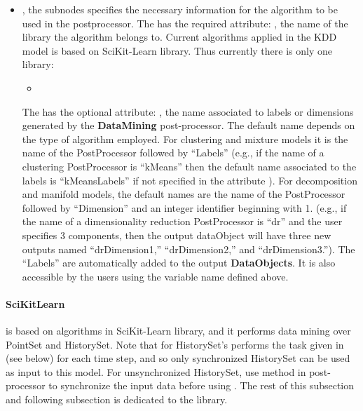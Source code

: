 \begin{itemize}
  \item {} , the subnodes specifies
  the necessary information for the algorithm to be used in the postprocessor.
  The  has the required attribute: , the name of the
  library the algorithm belongs to. Current algorithms applied in the KDD model
  is based on SciKit-Learn library. Thus currently there is only one library:
  \begin{itemize}
    \item {}
  \end{itemize}
  The  has the optional attribute: , the name
  associated to labels or dimensions generated by the \textbf{DataMining}
  post-processor.
  The default name depends on the type of algorithm employed.
  For clustering and mixture models it is the name of the PostProcessor
  followed by ``Labels'' (e.g., if the name of a clustering PostProcessor is
  ``kMeans'' then the default name associated to the labels is ``kMeansLabels''
  if not specified in the attribute ).
  For decomposition and manifold models, the default names are the name of the
  PostProcessor followed by ``Dimension'' and an integer identifier beginning
  with 1. (e.g., if the name of a dimensionality reduction PostProcessor is
  ``dr'' and the user specifies 3 components, then the output dataObject will
  have three new outputs named ``drDimension1,'' ``drDimension2,'' and
  ``drDimension3.'').
  \nb The ``Labels'' are automatically added to the output \textbf{DataObjects}. It
  is also accessible by the users using the variable name defined above.
\end{itemize}


\paragraph{SciKitLearn}
 is based on algorithms in SciKit-Learn library, and it performs data mining over PointSet and HistorySet. Note that for HistorySet's  performs the task given in  (see below) for each time step, and so only synchronized HistorySet can be used as input to this model. For unsynchronized HistorySet, use  method in  post-processor to synchronize the input data before using . The rest of this subsection and following subsection is dedicated to the  library.

